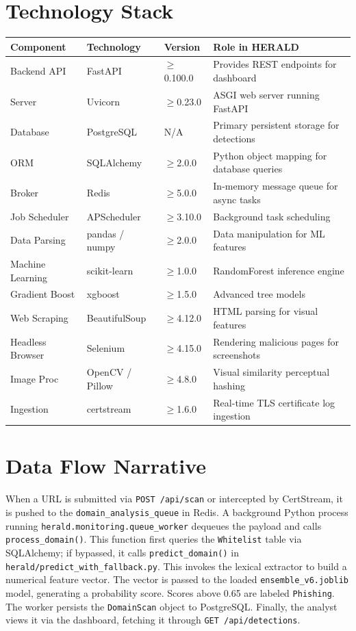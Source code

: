 \documentclass[12pt,a4paper]{report}
\begin{document}
\section{Technology Stack}
\begin{longtable}{|p{3cm}|p{3cm}|p{2cm}|p{6cm}|}
\hline
\textbf{Component} & \textbf{Technology} & \textbf{Version} & \textbf{Role in HERALD} \\
\hline
\endhead
Backend API & FastAPI & $\geq$0.100.0 & Provides REST endpoints for dashboard \\
Server & Uvicorn & $\geq$0.23.0 & ASGI web server running FastAPI \\
Database & PostgreSQL & N/A & Primary persistent storage for detections \\
ORM & SQLAlchemy & $\geq$2.0.0 & Python object mapping for database queries \\
Broker & Redis & $\geq$5.0.0 & In-memory message queue for async tasks \\
Job Scheduler & APScheduler & $\geq$3.10.0 & Background task scheduling \\
Data Parsing & pandas / numpy & $\geq$2.0.0 & Data manipulation for ML features \\
Machine Learning & scikit-learn & $\geq$1.0.0 & RandomForest inference engine \\
Gradient Boost & xgboost & $\geq$1.5.0 & Advanced tree models \\
Web Scraping & BeautifulSoup & $\geq$4.12.0 & HTML parsing for visual features \\
Headless Browser & Selenium & $\geq$4.15.0 & Rendering malicious pages for screenshots \\
Image Proc & OpenCV / Pillow & $\geq$4.8.0 & Visual similarity perceptual hashing \\
Ingestion & certstream & $\geq$1.6.0 & Real-time TLS certificate log ingestion \\
\hline
\end{longtable}

\section{Data Flow Narrative}
When a URL is submitted via \texttt{POST /api/scan} or intercepted by CertStream, it is pushed to the \texttt{domain\_analysis\_queue} in Redis. A background Python process running \texttt{herald.monitoring.queue\_worker} dequeues the payload and calls \texttt{process\_domain()}. This function first queries the \texttt{Whitelist} table via SQLAlchemy; if bypassed, it calls \texttt{predict\_domain()} in \texttt{herald/predict\_with\_fallback.py}. This invokes the lexical extractor to build a numerical feature vector. The vector is passed to the loaded \texttt{ensemble\_v6.joblib} model, generating a probability score. Scores above 0.65 are labeled \texttt{Phishing}. The worker persists the \texttt{DomainScan} object to PostgreSQL. Finally, the analyst views it via the dashboard, fetching it through \texttt{GET /api/detections}.
\end{document}
